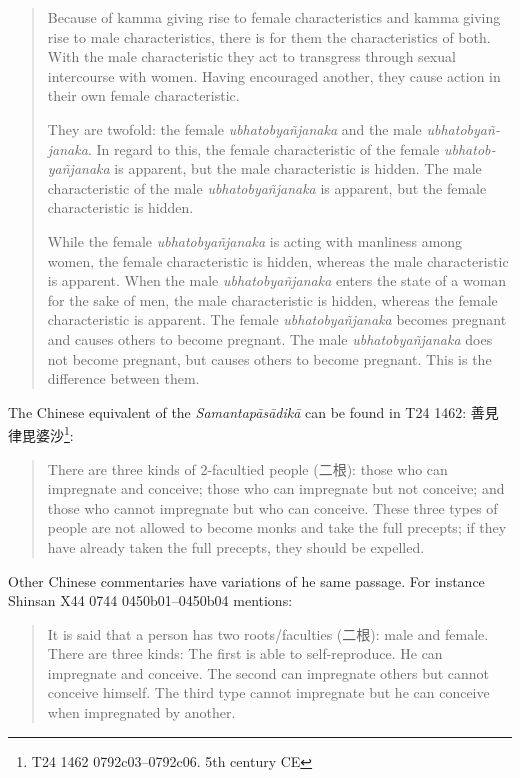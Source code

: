 \begin{quote}
Because of kamma giving rise to female characteristics and kamma giving rise to male characteristics, there is for them the characteristics of both. With the male characteristic they act to transgress through sexual intercourse with women. Having encouraged another, they cause action in their own female characteristic. 

They are twofold: the female {\em ubhatob­yañ­janaka} and the male {\em ubhatob­yañ­janaka}. In regard to this, the female characteristic of the female {\em ubhatob­yañ­janaka} is apparent, but the male characteristic is hidden. The male characteristic of the male {\em ubhatob­yañ­janaka} is apparent, but the female characteristic is hidden. 

While the female {\em ubhatob­yañ­janaka} is acting with manliness among women, the female characteristic is hidden, whereas the male characteristic is apparent. 
When the male {\em ubhatob­yañ­janaka} enters the state of a woman for the sake of men, the male characteristic is hidden, whereas the female characteristic is apparent. 
The female {\em ubhatob­yañ­janaka} becomes pregnant and causes others to become pregnant. The male {\em ubhatob­yañ­janaka} does not become pregnant, but causes others to become pregnant. This is the difference between them.
\end{quote}

The Chinese equivalent of the {\em Samantapāsādikā} can be found in T24 1462: 善見律毘婆沙\footnote{T24 1462 0792c03–0792c06. 5th century CE}:
\begin{quote}
There are three kinds of 2-facultied people (二根): those who can impregnate and conceive; those who can impregnate but not conceive; and those who cannot impregnate but who can conceive. These three types of people are not allowed to become monks and take the full precepts; if they have already taken the full precepts, they should be expelled.
\end{quote}

Other Chinese commentaries have variations of he same passage. For instance Shinsan X44 0744 0450b01–0450b04 mentions:
\begin{quote}
It is said that a person has two roots/faculties (二根): male and female. There are three kinds: The first is able to self-reproduce. He can impregnate and conceive. The second can impregnate others but cannot conceive himself. The third type cannot impregnate but he can conceive when impregnated by another. 
\end{quote}

